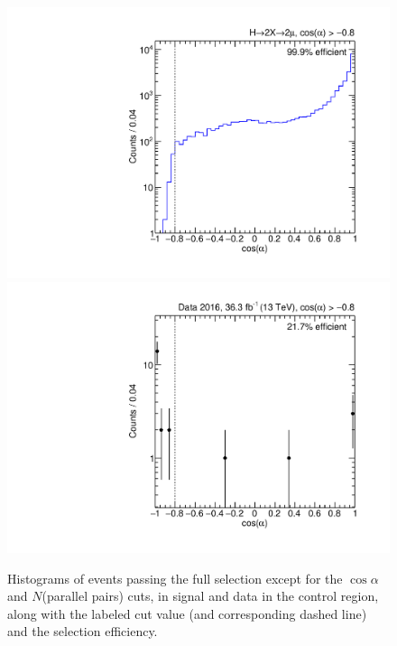 \begin{figure}[p]
  \centering
  \includegraphics[width=\DSquareWidth]{figures/displaced/NM1_2Mu2J_cosAlpha.pdf}
  \hspace*{-2em}
  \includegraphics[width=\DSquareWidth]{figures/displaced/NM1_Data_cosAlpha.pdf}
  \caption[Histograms of events passing the full selection except for the $\cos{\alpha}$ and $N$(parallel pairs) cuts in \twoMu signal and data.]{Histograms of events passing the full selection except for the $\cos{\alpha}$ and $N$(parallel pairs) cuts, in  \twoMu signal and  data in the control region, along with the labeled cut value (and corresponding dashed line) and the selection efficiency.}
  \label{fig:dd:NM1_cosAlpha}
\end{figure}

